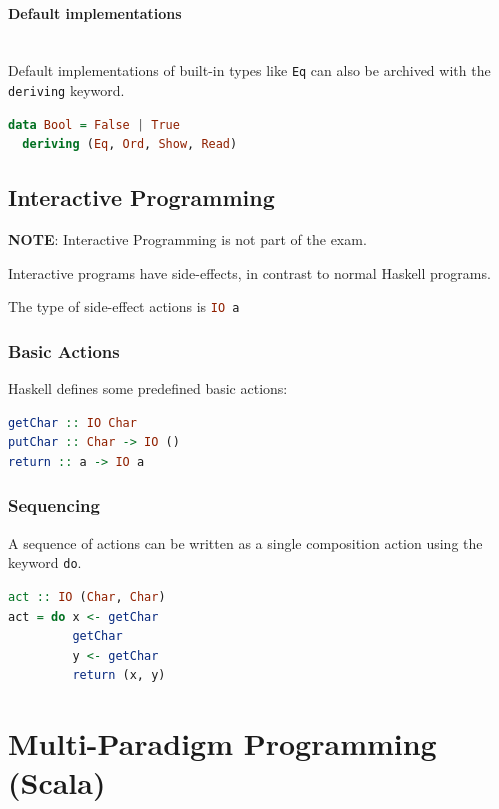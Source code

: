 \paragraph{Default implementations} \hfill \\

Default implementations of built-in types like \lstinline|Eq| can also be archived with the \lstinline|deriving| keyword.
\begin{lstlisting}[language=haskell]
data Bool = False | True
  deriving (Eq, Ord, Show, Read)
\end{lstlisting}

\subsection{Interactive Programming}

\textbf{NOTE}: Interactive Programming is not part of the exam.

Interactive programs have side-effects, in contrast to normal Haskell programs.

The type of side-effect actions is \lstinline[language=haskell]|IO a|

\subsubsection{Basic Actions}

Haskell defines some predefined basic actions:

\begin{lstlisting}[language=haskell]
getChar :: IO Char
putChar :: Char -> IO ()
return :: a -> IO a
\end{lstlisting}

\subsubsection{Sequencing}

A sequence of actions can be written as a single composition action using the keyword \lstinline|do|.

\begin{lstlisting}[language=haskell]
act :: IO (Char, Char)
act = do x <- getChar
         getChar
         y <- getChar
         return (x, y)
\end{lstlisting}

\section{Multi-Paradigm Programming (Scala)}


